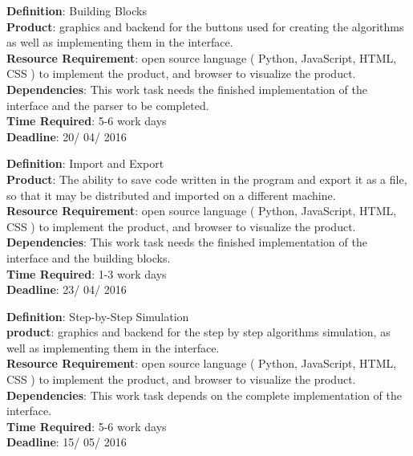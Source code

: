 \documentclass[11pt]{article}
\begin{document}
\noindent\textbf{Definition}: Building Blocks \\
\textbf{Product}: graphics and backend for the buttons used for creating the algorithms as well as implementing them in the interface.\\
\textbf{Resource Requirement}: open source language ( Python, JavaScript, HTML, CSS ) to implement the product, and browser to visualize the product. \\
\textbf{Dependencies}: This work task needs the finished implementation of the interface and the parser to be completed.\\
\textbf{Time Required}: 5-6 work days\\
\textbf{Deadline}: 20/ 04/ 2016\\
\noindent\makebox[\linewidth]{\rule{\paperwidth}{0.4pt}}

\noindent\textbf{Definition}: Import and Export \\
\textbf{Product}: The ability to save code written in the program and export it as a file, so that it may be distributed and imported on a different machine.\\
\textbf{Resource Requirement}: open source language ( Python, JavaScript, HTML, CSS ) to implement the product, and browser to visualize the product. \\
\textbf{Dependencies}: This work task needs the finished implementation of the interface and the building blocks.\\
\textbf{Time Required}: 1-3 work days\\
\textbf{Deadline}: 23/ 04/ 2016\\
\noindent\makebox[\linewidth]{\rule{\paperwidth}{0.4pt}}

\noindent\textbf{Definition}:  Step-by-Step Simulation\\
\textbf{product}: graphics and backend for the step by step  algorithms simulation, as well as implementing them in the interface.\\
\textbf{Resource Requirement}: open source language ( Python, JavaScript, HTML, CSS ) to implement the product, and browser to visualize the product. \\
\textbf{Dependencies}: This work task depends on the complete implementation of the interface.\\
\textbf{Time Required}: 5-6 work days\\
\textbf{Deadline}: 15/ 05/ 2016\\
\noindent\makebox[\linewidth]{\rule{\paperwidth}{0.4pt}}
\end{document}
